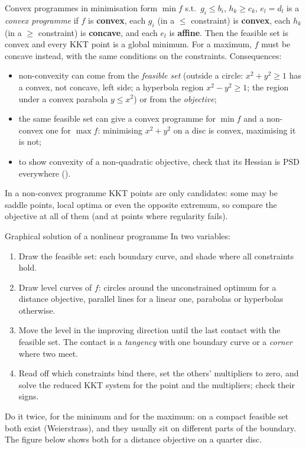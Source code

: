 \begin{rulebox}{Convex programmes in minimisation form}
$\min f$ s.t.\ $g_i\le b_i$, $h_k\ge c_k$, $e_l=d_l$ is a \emph{convex
programme} if $f$ is \textbf{convex}, each $g_i$ (in a $\le$ constraint) is
\textbf{convex}, each $h_k$ (in a $\ge$ constraint) is \textbf{concave},
and each $e_l$ is \textbf{affine}. Then the feasible set is convex and every
KKT point is a global minimum. For a maximum, $f$ must be concave instead,
with the same conditions on the constraints. Consequences:
\begin{itemize}[leftmargin=1.6em,itemsep=0.3ex]
  \item non-convexity can come from the \emph{feasible set} (outside a
        circle: $x^{2}+y^{2}\ge1$ has a convex, not concave, left side; a
        hyperbola region $x^{2}-y^{2}\ge1$; the region under a convex
        parabola $y\le x^{2}$) or from the \emph{objective};
  \item the same feasible set can give a convex programme for $\min f$ and
        a non-convex one for $\max f$: minimising $x^{2}+y^{2}$ on a disc
        is convex, maximising it is not;
  \item to show convexity of a non-quadratic objective, check that its
        Hessian is PSD everywhere ().
\end{itemize}
In a non-convex programme KKT points are only candidates: some may be
saddle points, local optima or even the opposite extremum, so compare the
objective at all of them (and at points where regularity fails).
\end{rulebox}

\begin{rulebox}{Graphical solution of a nonlinear programme}
In two variables:
\begin{enumerate}[leftmargin=1.8em,itemsep=0.3ex]
  \item Draw the feasible set: each boundary curve, and shade where all
        constraints hold.
  \item Draw level curves of $f$: circles around the unconstrained optimum
        for a distance objective, parallel lines for a linear one,
        parabolas or hyperbolas otherwise.
  \item Move the level in the improving direction until the last contact
        with the feasible set. The contact is a \emph{tangency} with one
        boundary curve or a \emph{corner} where two meet.
  \item Read off which constraints bind there, set the others' multipliers
        to zero, and solve the reduced KKT system for the point and the
        multipliers; check their signs.
\end{enumerate}
Do it twice, for the minimum and for the maximum: on a compact feasible set
both exist (Weierstrass), and they usually sit on different parts of the
boundary. The figure below shows both for a distance objective on a quarter
disc.
\end{rulebox}

